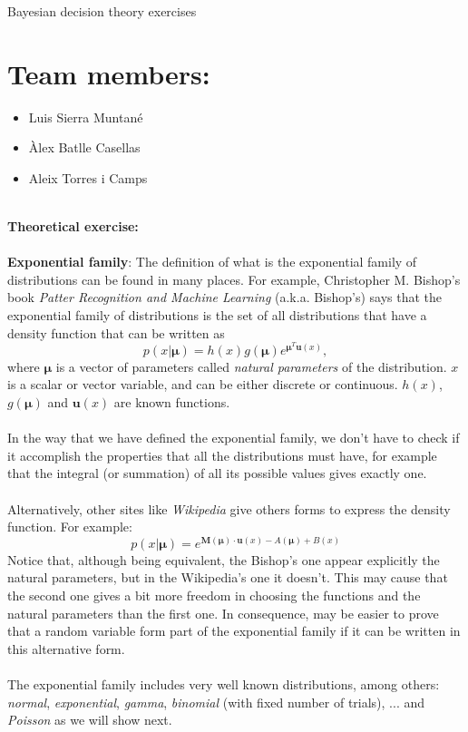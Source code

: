 \documentclass[10pt]{article}
\begin{document}
\begingroup
  \centering
  \Huge Bayesian decision theory exercises
  \vskip 1cm
\endgroup
\section{Team members:}
\begin{itemize}
  \item Luis Sierra Muntané
  \item Àlex Batlle Casellas
  \item Aleix Torres i Camps
\end{itemize}
\ \\
\Huge{\textbf{Theoretical exercise:}} \\ \ \\
\Large{\textbf{Exponential family}}:
\Large
The definition of what is the exponential family of distributions can be found in many places. For example, Christopher M. Bishop's book \textit{Patter Recognition and Machine Learning} (a.k.a. Bishop's) says that the exponential family of distributions is the set of all distributions that have a density function that can be written as
$$
p(x|\bm\mu)=
h(x)g(\bm\mu)e^{\bm\mu^T \bm{u}(x)},
$$
where $\bm\mu$ is a vector of parameters called \textit{natural parameters} of the distribution. $x$ is a scalar or vector variable, and can be either discrete or continuous. $h(x)$, $g(\bm\mu)$ and $\bm{u}(x)$ are known functions. \\ \ \\
In the way that we have defined the exponential family, we don't have to check if it accomplish the properties that all the distributions must have, for example that the integral (or summation) of all its possible values gives exactly one. \\ \ \\
Alternatively, other sites like \textit{Wikipedia} give others forms to express the density function. For example:
$$
p(x|\bm\mu)= e^{\bm M(\bm\mu)\cdot \bm u(x)-A(\bm\mu)+B(x)}
$$
Notice that, although being equivalent, the Bishop's one appear explicitly the natural parameters, but in the Wikipedia's one it doesn't. This may cause that the second one gives a bit more freedom in choosing the functions and the natural parameters than the first one. In consequence, may be easier to prove that a random variable form part of the exponential family if it can be written in this alternative form. \\ \ \\
The exponential family includes very well known distributions, among others: \textit{normal}, \textit{exponential}, \textit{gamma}, \textit{binomial} (with fixed number of trials), ... and \textit{Poisson} as we will show next. \\
\end{document}
